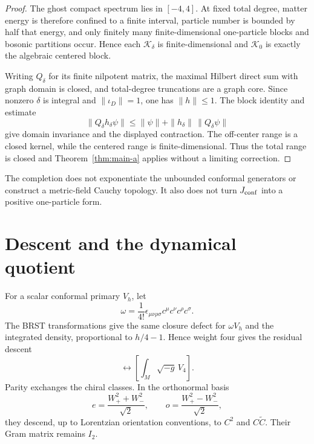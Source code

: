 \documentclass[11pt]{article}
\theoremstyle{remark}
\newcommand{\K}{\mathscr K}
\begin{document}
\begin{proof}
The ghost compact spectrum lies in $[-4,4]$.  At fixed total degree, matter
energy is therefore confined to a finite interval, particle number is
bounded by half that energy, and only finitely many finite-dimensional
one-particle blocks and bosonic partitions occur.  Hence each $\K_\delta$ is
finite-dimensional and $\K_0$ is exactly the algebraic centered block.

Writing $Q_\delta$ for its finite nilpotent matrix, the maximal Hilbert direct
sum with graph domain is closed, and total-degree truncations are a graph
core.  Since nonzero $\delta$ is integral and $\|\iota_D\|=1$, one has
$\|h\|\le1$.  The block identity and estimate
\[
 \|Q_\delta h_\delta\psi\|
 \le\|\psi\|+\|h_\delta\|\,\|Q_\delta\psi\|
\]
give domain invariance and the displayed contraction.  The off-center range
is a closed kernel, while the centered range is finite-dimensional.  Thus
the total range is closed and Theorem~\ref{thm:main-a} applies without a
limiting correction.
\end{proof}

The completion does not exponentiate the unbounded conformal generators or
construct a metric-field Cauchy topology.  It also does not turn
$J_{\rm conf}$ into a positive one-particle form.

\section{Descent and the dynamical quotient}

For a scalar conformal primary $V_h$, let
\begin{equation}
 \omega=\frac1{4!}\epsilon_{\mu\nu\rho\sigma}
 c^\mu c^\nu c^\rho c^\sigma.
\end{equation}
The BRST transformations give the same closure defect for $\omega V_h$ and
the integrated density, proportional to $h/4-1$.  Hence weight four gives
the residual descent
\begin{equation}
 [\omega V_4]\longleftrightarrow
 \left[\int_M\sqrt{-g}\,V_4\right].
\end{equation}
Parity exchanges the chiral classes.  In the orthonormal basis
\begin{equation}\label{eq:parity-a}
 e=\frac{W_+^2+W_-^2}{\sqrt2},
 \qquad o=\frac{W_+^2-W_-^2}{\sqrt2},
\end{equation}
they descend, up to Lorentzian orientation conventions, to $C^2$ and
$C\widetilde C$.  Their Gram matrix remains $I_2$.
\end{document}
